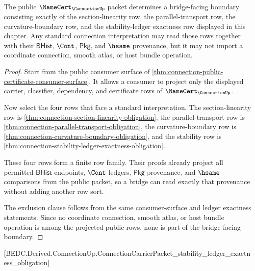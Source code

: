 \begin{theorem}
\label{thm:connection-standard-bridge-boundary}
The public $\NameCert_{\ConnectionUp}$ packet determines a bridge-facing
boundary consisting exactly of the section-linearity row, the
parallel-transport row, the curvature-boundary row, and the stability-ledger
exactness row displayed in this chapter. Any standard connection
interpretation may read those rows together with their $\mathsf{BHist}$,
$\Cont$, $\mathsf{Pkg}$, and $\hsame$ provenance, but it may not import a
coordinate connection, smooth atlas, or host bundle operation.
\end{theorem}
\begin{proof}
Start from the public consumer surface of
\autoref{thm:connection-public-certificate-consumer-surface}. It allows a
consumer to project only the displayed carrier, classifier, dependency, and
certificate rows of $\NameCert_{\ConnectionUp}$.

Now select the four rows that face a standard interpretation. The
section-linearity row is \autoref{thm:connection-section-linearity-obligation},
the parallel-transport row is
\autoref{thm:connection-parallel-transport-obligation}, the curvature-boundary
row is \autoref{thm:connection-curvature-boundary-obligation}, and the
stability row is
\autoref{thm:connection-stability-ledger-exactness-obligation}.

These four rows form a finite row family. Their proofs already project all
permitted $\mathsf{BHist}$ endpoints, $\Cont$ ledgers, $\mathsf{Pkg}$
provenance, and $\hsame$ comparisons from the public packet, so a bridge can
read exactly that provenance without adding another row sort.

The exclusion clause follows from the same consumer-surface and ledger
exactness statements. Since no coordinate connection, smooth atlas, or host
bundle operation is among the projected public rows, none is part of the
bridge-facing boundary.
\end{proof}

[BEDC.Derived.ConnectionUp.ConnectionCarrierPacket\_stability\_ledger\_exactness\_obligation]


